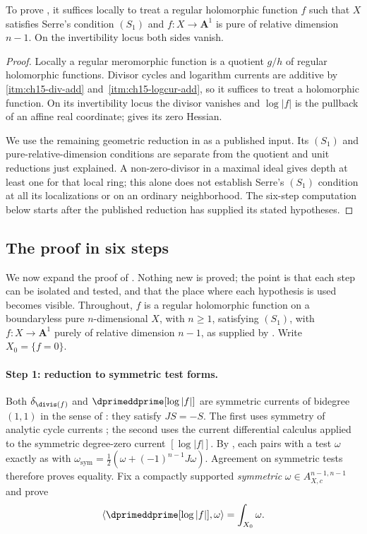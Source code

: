 \begin{lemma}\label{lem:pl-formal-reductions}
To prove , it suffices locally to treat a
regular holomorphic function $f$ such that $X$ satisfies Serre's condition
$(S_1)$ and $f:X\to\mathbf A^1$ is pure of relative dimension $n-1$.
On the invertibility locus both sides vanish.
\end{lemma}
\begin{proof}
Locally a regular meromorphic function is a quotient $g/h$ of regular
holomorphic functions. Divisor cycles and logarithm currents are additive
by \,\cref{itm:ch15-div-add} and
\,\cref{itm:ch15-logcur-add}, so it suffices
to treat a holomorphic function. On its invertibility locus the divisor
vanishes and $\log|f|$ is the pullback of an affine real coordinate;
 gives its zero Hessian.

We use the remaining geometric reduction in \cite[Lemma~16.7.5]{CLD25}
as a published input. Its $(S_1)$ and pure-relative-dimension conditions
are separate from the quotient and unit reductions just explained.
A non-zero-divisor in a maximal ideal gives depth at least one for that
local ring; this alone does not establish Serre's $(S_1)$ condition at all
its localizations or on an ordinary neighborhood. The six-step computation
below starts after the published reduction has supplied its stated
hypotheses.
\end{proof}

\subsection{The proof in six steps}
\label{sec:ch15-pl-proof-detail}

We now expand the proof of .  Nothing new is
proved; the point is that each step can be isolated and tested, and that the
place where each hypothesis is used becomes visible.  Throughout, $f$ is a
regular holomorphic function on a boundaryless pure $n$-dimensional $X$,
with $n\geq1$,
satisfying $(S_1)$, with $f:X\to\mathbf A^1$ purely of relative dimension
$n-1$, as supplied by .  Write
$X_0=\{f=0\}$.

\paragraph{Step 1: reduction to symmetric test forms.}
Both $\delta_{\divis(f)}$ and $\dprimeddprime[\log|f|]$ are symmetric
currents of bidegree $(1,1)$ in the sense of
: they satisfy $JS=-S$. The first uses
symmetry of analytic cycle currents \cite[Proposition~7.7.9]{CLD25}; the
second uses the current differential calculus applied to the symmetric
degree-zero current $[\log|f|]$. By , each pairs
with a test $\omega$ exactly as with
$\omega_{\mathrm{sym}}=\tfrac12(\omega+(-1)^{n-1}J\omega)$.
Agreement on symmetric tests therefore proves equality. Fix a compactly
supported \emph{symmetric} $\omega\in A_{X,c}^{n-1,n-1}$ and prove
\[
 \langle\dprimeddprime[\log|f|],\omega\rangle=\int_{X_0}\omega .
\]

